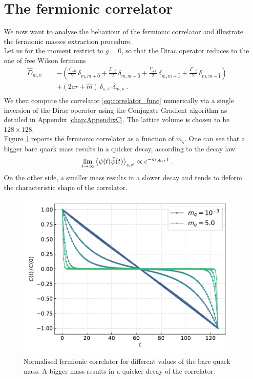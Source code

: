 \section{The fermionic correlator}
We now want to analyse the behaviour of the fermionic correlator and illustrate the fermionic masses extraction procedure. \\
Let us for the moment restrict to $g = 0$, so that the Dirac operator reduces to the one of free Wilson fermions 
\begin{equation}
    \begin{aligned}
    \widehat{D}_{m, n} = &- \left(\frac{\Gamma_{+\hat 0}}{2} \, \delta_{m, m+\hat 0} +\frac{\Gamma_{-\hat 0}}{2} \, \delta_{m, m-\hat 0} + \frac{\Gamma_{+\hat 1}}{2} \, \delta_{m, m+\hat 1} + \frac{\Gamma_{- \hat 1}}{2} \, \delta_{m, m-\hat 1}\right)  \\
     &+ \left(2ar + \hat m \right) \, \delta_{s,s'} \, \delta_{m,n} \, . \\
    \end{aligned}
    \label{eq:wilson-dirac_operator_free}
\end{equation}
We then compute the correlator \eqref{eq:correlator_func} numerically via a single inversion of the Dirac operator using the Conjugate Gradient algorithm as detailed in Appendix \ref{chap:AppendixC}. The lattice volume is chosen to be $128 \times 128$. \\
Figure \ref{fig:correlator_mass} reports the fermionic correlator as a function of $m_q$. One can see that a bigger bare quark mass results in a quicker decay, according to the decay law 
\begin{equation}
    \lim_{t \to \infty} \left\langle \psi(t)\bar\psi(t) \right\rangle_{s,s'} \propto e^{-m_\text{phys} \, t} \, .
    \label{eq:decay_law_correlator}
\end{equation}
On the other side, a smaller mass results in a slower decay and tends to deform the characteristic shape of the correlator.
\begin{figure}[]
    \centering 
    \includegraphics[scale=0.6]{figures/correlator/correlator.pdf}
    \caption[Fermionic correlator]{Normalised fermionic correlator for different values of the bare quark mass. A bigger mass results in a quicker decay of the correlator.}
    \label{fig:correlator_mass}
\end{figure}\\
